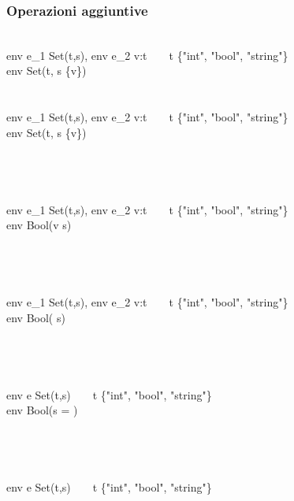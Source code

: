 \documentclass{article}
\begin{document}
\subsubsection{Operazioni aggiuntive}
\infr
  {\\env \vartriangleright{} e_1 \implies Set(t,s), env \vartriangleright{} e_2 \implies v:t\ \ \ \ t \in \{"int", "bool", "string"\}}     
  {\\env \vartriangleright{}  \implies Set(t, s \cup \{v\}) }  
~\\~\\
\infr
  {\\env \vartriangleright{} e_1 \implies Set(t,s), env \vartriangleright{} e_2 \implies v:t\ \ \ \ t \in \{"int", "bool", "string"\}}     
  {\\env \vartriangleright{}  \implies Set(t, s \setminus \{v\}) }  
~\\~\\~\\~\\
\infr
  {\\env \vartriangleright{} e_1 \implies Set(t,s), env \vartriangleright{} e_2 \implies v:t\ \ \ \ t \in \{"int", "bool", "string"\}}     
  {\\env \vartriangleright{}  \implies Bool(v \in s) }  
~\\~\\~\\~\\
\infr
  {\\env \vartriangleright{} e_1 \implies Set(t,s), env \vartriangleright{} e_2 \implies v:t\ \ \ \ t \in \{"int", "bool", "string"\}}     
  {\\env \vartriangleright{}  \implies Bool( \in s) }  
~\\~\\~\\~\\
\infr
  {\\env \vartriangleright{} e \implies Set(t,s)\ \ \ \ t \in \{"int", "bool", "string"\}}     
  {\\env \vartriangleright{}  \implies Bool(s = \emptyset) }  
~\\~\\~\\~\\
\infr
  {\\env \vartriangleright{} e \implies Set(t,s)\ \ \ \ t \in \{"int", "bool", "string"\}}     
\end{document}
